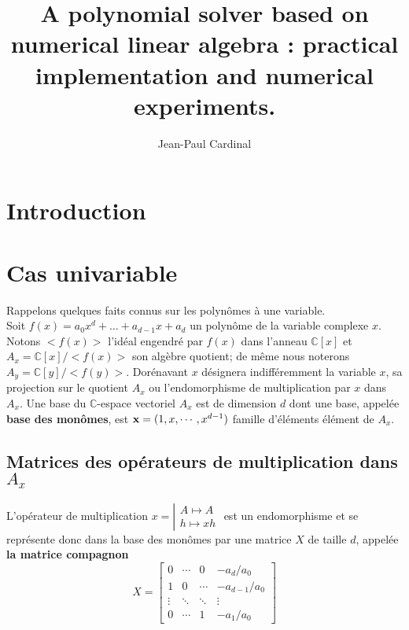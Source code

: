 \documentclass{article}
\theoremstyle{plain}%
\theoremstyle{definition}
\theoremstyle{remark}
\newcommand{\C}{\mathbb{C}}
\begin{document}

\title{A polynomial solver based on numerical linear algebra : practical implementation and numerical experiments.}
\author{Jean-Paul Cardinal}



\begin{abstract}
\end{abstract}


\section{Introduction}


\section{Cas univariable}
\label{univariable}

Rappelons quelques faits connus sur les polynômes à une variable.\\
Soit $f(x) = a_0x^d + \dots + a_{d-1}x + a_d$ un polynôme de la variable complexe $x$. Notons $<f(x)>$ l'idéal engendré par $f(x)$ dans l'anneau $\C[x]$ et $A_x = \C[x]/<f(x)>$  son algèbre quotient; de même nous noterons $A_y = \C[y]/<f(y)>$. Dorénavant $x$ désignera indifféremment la variable $x$, sa projection sur le quotient $A_x$ ou l'endomorphisme de multiplication par $x$ dans $A_x$. Une base du $\C$-espace vectoriel $A_x$ est de dimension $d$ dont une base, appelée {\bf base des monômes}, est $\bold{x} = (1, x,\cdots, x^{d-1})$ famille d'éléments élément de $A_x$.

\subsection{Matrices des opérateurs de multiplication dans $A_x$}
L'opérateur de multiplication
$x = \left\vert
\begin{array}{c}
A \mapsto A \\
h \mapsto xh
\end{array}
\right.$ est un endomorphisme et se représente donc dans la base des monômes par
une matrice $X$ de taille $d$, appelée {\bf la matrice compagnon}
\begin{equation}
\label{compan}
X =
\begin{bmatrix}
	0 & \cdots & 0 & -a_d/a_0 \\
	1 & 0 & \cdots & -a_{d-1}/a_0 \\
	\vdots  & \ddots  & \ddots & \vdots  \\
	0 & \cdots & 1 & -a_1/a_0
\end{bmatrix}
\end{equation}
\end{document}
